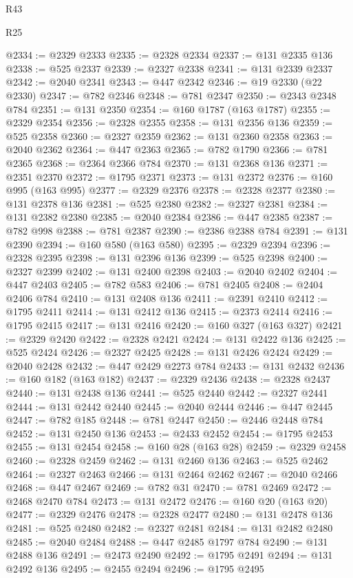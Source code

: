 \begin{lexlean}{R43}
\begin{lexlean}{R25}
\begin{coremodule}
{{{{{{{{{{{{{{{{{{{{{{{{{{{{{{{{{{{{{{{{{{{{{{{{{{{{{{{{{{{{{{{{{{{{{{{{{{{{{{{{{{{{{{{{{{{{{{{{{{{{{{{{{{{{{{{{{{{{{{{{{{{{{{{{{{{{{{{{{{{{{{{{{{{{{{{{{{{{{{{{{{{{{{{{{{{{{{{{{{{{{{{{{{{{{{{{{@2334 := @2329 @2333
@2335 := @2328 @2334
@2337 := @131 @2335 @136
@2338 := @525 @2337
@2339 := @2327 @2338
@2341 := @131 @2339 @2337
@2342 := @2040 @2341
@2343 := @447 @2342
@2346 := @19 @2330 (@22 @2330)
@2347 := @782 @2346
@2348 := @781 @2347
@2350 := @2343 @2348 @784
@2351 := @131 @2350
@2354 := @160 @1787 (@163 @1787)
@2355 := @2329 @2354
@2356 := @2328 @2355
@2358 := @131 @2356 @136
@2359 := @525 @2358
@2360 := @2327 @2359
@2362 := @131 @2360 @2358
@2363 := @2040 @2362
@2364 := @447 @2363
@2365 := @782 @1790
@2366 := @781 @2365
@2368 := @2364 @2366 @784
@2370 := @131 @2368 @136
@2371 := @2351 @2370
@2372 := @1795 @2371
@2373 := @131 @2372
@2376 := @160 @995 (@163 @995)
@2377 := @2329 @2376
@2378 := @2328 @2377
@2380 := @131 @2378 @136
@2381 := @525 @2380
@2382 := @2327 @2381
@2384 := @131 @2382 @2380
@2385 := @2040 @2384
@2386 := @447 @2385
@2387 := @782 @998
@2388 := @781 @2387
@2390 := @2386 @2388 @784
@2391 := @131 @2390
@2394 := @160 @580 (@163 @580)
@2395 := @2329 @2394
@2396 := @2328 @2395
@2398 := @131 @2396 @136
@2399 := @525 @2398
@2400 := @2327 @2399
@2402 := @131 @2400 @2398
@2403 := @2040 @2402
@2404 := @447 @2403
@2405 := @782 @583
@2406 := @781 @2405
@2408 := @2404 @2406 @784
@2410 := @131 @2408 @136
@2411 := @2391 @2410
@2412 := @1795 @2411
@2414 := @131 @2412 @136
@2415 := @2373 @2414
@2416 := @1795 @2415
@2417 := @131 @2416
@2420 := @160 @327 (@163 @327)
@2421 := @2329 @2420
@2422 := @2328 @2421
@2424 := @131 @2422 @136
@2425 := @525 @2424
@2426 := @2327 @2425
@2428 := @131 @2426 @2424
@2429 := @2040 @2428
@2432 := @447 @2429 @2273 @784
@2433 := @131 @2432
@2436 := @160 @182 (@163 @182)
@2437 := @2329 @2436
@2438 := @2328 @2437
@2440 := @131 @2438 @136
@2441 := @525 @2440
@2442 := @2327 @2441
@2444 := @131 @2442 @2440
@2445 := @2040 @2444
@2446 := @447 @2445
@2447 := @782 @185
@2448 := @781 @2447
@2450 := @2446 @2448 @784
@2452 := @131 @2450 @136
@2453 := @2433 @2452
@2454 := @1795 @2453
@2455 := @131 @2454
@2458 := @160 @28 (@163 @28)
@2459 := @2329 @2458
@2460 := @2328 @2459
@2462 := @131 @2460 @136
@2463 := @525 @2462
@2464 := @2327 @2463
@2466 := @131 @2464 @2462
@2467 := @2040 @2466
@2468 := @447 @2467
@2469 := @782 @31
@2470 := @781 @2469
@2472 := @2468 @2470 @784
@2473 := @131 @2472
@2476 := @160 @20 (@163 @20)
@2477 := @2329 @2476
@2478 := @2328 @2477
@2480 := @131 @2478 @136
@2481 := @525 @2480
@2482 := @2327 @2481
@2484 := @131 @2482 @2480
@2485 := @2040 @2484
@2488 := @447 @2485 @1797 @784
@2490 := @131 @2488 @136
@2491 := @2473 @2490
@2492 := @1795 @2491
@2494 := @131 @2492 @136
@2495 := @2455 @2494
@2496 := @1795 @2495
}}}}}}}}}}}}}}}}}}}}}}}}}}}}}}}}}}}}}}}}}}}}}}}}}}}}}}}}}}}}}}}}}}}}}}}}}}}}}}}}}}}}}}}}}}}}}}}}}}}}}}}}}}}}}}}}}}}}}}}}}}}}}}}}}}}}}}}}}}}}}}}}}}}}}}}}}}}}}}}}}}}}}}}}}}}}}}}}}}}}}}}}}}}}}}}}}
\end{coremodule}
\end{lexlean}
\end{lexlean}
